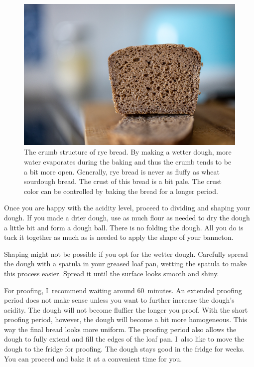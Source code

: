 \begin{figure}[!htb]
  \includegraphics[width=\textwidth]{crumb}
  \caption[Rye bread]{The crumb structure of rye bread. By making a wetter
  dough, more water evaporates during the baking and thus the
  crumb tends to be a bit more open. Generally, rye
  bread is never as fluffy as wheat sourdough bread. The crust
  of this bread is a bit pale. The crust color can be controlled
  by baking the bread for a longer period.}%
  \label{fig:rye-crumb}
\end{figure}

Once you are happy with the acidity level, proceed to dividing
and shaping your dough.  If you made a drier dough, use as much
flour as needed to dry the dough a little bit and form a dough ball.
There is no folding the dough. All you do is tuck it together
as much as is needed to apply the shape of your banneton.

Shaping might not be possible if you opt for the wetter dough. Carefully spread
the dough with a spatula in your greased loaf pan, wetting the spatula to make
this process easier. Spread it until the surface looks smooth and shiny.

For proofing, I~recommend waiting around 60~minutes. An extended
proofing period does not make sense unless you want to further
increase the dough's acidity. The dough will not become fluffier
the longer you proof. With the short proofing period, however,
the dough will become a bit more homogeneous. This way the final
bread looks more uniform. The proofing period also allows the
dough to fully extend and fill the edges of the loaf pan. I~also
like to move the dough to the fridge for proofing. The dough stays
good in the fridge for weeks. You can proceed and bake it at a
convenient time for you. 

